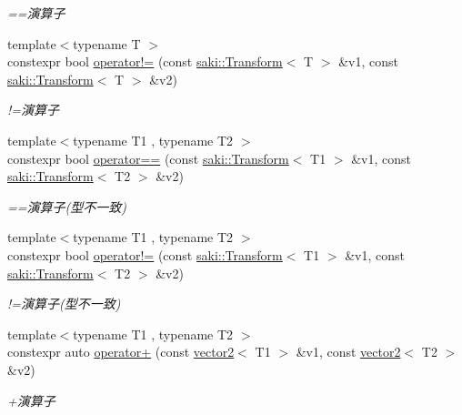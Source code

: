 \begin{DoxyCompactItemize}
\begin{DoxyCompactList}\small\item\em ==演算子 \end{DoxyCompactList}\item 
{\footnotesize template$<$typename T $>$ }\\constexpr bool \mbox{\hyperlink{namespacesaki_aeb1efde4ebc127c358fe17c9725fc622}{operator!=}} (const \mbox{\hyperlink{classsaki_1_1_transform}{saki\+::\+Transform}}$<$ T $>$ \&v1, const \mbox{\hyperlink{classsaki_1_1_transform}{saki\+::\+Transform}}$<$ T $>$ \&v2)
\begin{DoxyCompactList}\small\item\em !=演算子 \end{DoxyCompactList}\item 
{\footnotesize template$<$typename T1 , typename T2 $>$ }\\constexpr bool \mbox{\hyperlink{namespacesaki_a2caa00a8041e5dd4da3baf2e2575a980}{operator==}} (const \mbox{\hyperlink{classsaki_1_1_transform}{saki\+::\+Transform}}$<$ T1 $>$ \&v1, const \mbox{\hyperlink{classsaki_1_1_transform}{saki\+::\+Transform}}$<$ T2 $>$ \&v2)
\begin{DoxyCompactList}\small\item\em ==演算子(型不一致) \end{DoxyCompactList}\item 
{\footnotesize template$<$typename T1 , typename T2 $>$ }\\constexpr bool \mbox{\hyperlink{namespacesaki_abacbb997c38e24f818c0b63d26267aa3}{operator!=}} (const \mbox{\hyperlink{classsaki_1_1_transform}{saki\+::\+Transform}}$<$ T1 $>$ \&v1, const \mbox{\hyperlink{classsaki_1_1_transform}{saki\+::\+Transform}}$<$ T2 $>$ \&v2)
\begin{DoxyCompactList}\small\item\em !=演算子(型不一致) \end{DoxyCompactList}\item 
{\footnotesize template$<$typename T1 , typename T2 $>$ }\\constexpr auto \mbox{\hyperlink{namespacesaki_a7c132b30fc5554123e166c29a5292607}{operator+}} (const \mbox{\hyperlink{classsaki_1_1vector2}{vector2}}$<$ T1 $>$ \&v1, const \mbox{\hyperlink{classsaki_1_1vector2}{vector2}}$<$ T2 $>$ \&v2)
\begin{DoxyCompactList}\small\item\em +演算子 \end{DoxyCompactList}\item 

\end{DoxyCompactItemize}
